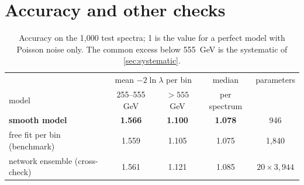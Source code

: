 \documentclass[11pt]{article}
\begin{document}
\section{Accuracy and other checks}
\label{sec:validation}

\begin{table}[h]
\centering
\small
\begin{tabular}{lcccc}
\toprule
 & \multicolumn{2}{c}{mean $-2\ln\lambda$ per bin} & median & parameters\\
model & 255--555 GeV & $>555$ GeV & per spectrum & \\
\midrule
\textbf{smooth model} & \textbf{1.566} & \textbf{1.100} & \textbf{1.078} & 946\\
free fit per bin (benchmark) & 1.559 & 1.105 & 1.075 & 1,840\\
network ensemble (cross-check) & 1.561 & 1.121 & 1.085 & $20\times3{,}944$\\
\bottomrule
\end{tabular}
\caption{Accuracy on the 1,000 test spectra; 1 is the value for a perfect model with Poisson
noise only. The common excess below 555~GeV is the systematic of \cref{sec:systematic}.}
\label{tab:accuracy}
\end{table}
\end{document}
